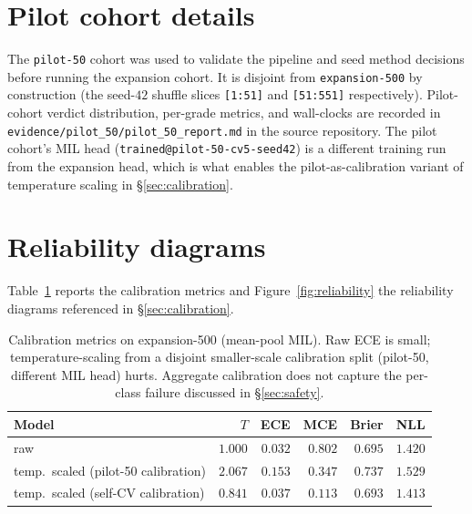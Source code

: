 \documentclass{article}
\newcommand{\SafeNum}[1]{#1}
\begin{document}
\appendix

\section{Pilot cohort details}
\label{app:pilot}

The \texttt{pilot-50} cohort was used to validate the pipeline and seed method decisions before running the expansion cohort. It is disjoint from \texttt{expansion-500} by construction (the seed-$\SafeNum{42}$ shuffle slices \texttt{[1:51]} and \texttt{[51:551]} respectively). Pilot-cohort verdict distribution, per-grade metrics, and wall-clocks are recorded in \texttt{evidence/pilot\_50/pilot\_50\_report.md} in the source repository. The pilot cohort's MIL head (\texttt{trained@pilot-50-cv5-seed42}) is a different training run from the expansion head, which is what enables the pilot-as-calibration variant of temperature scaling in \S\ref{sec:calibration}.

\section{Reliability diagrams}
\label{app:reliability}

Table~\ref{tab:calibration} reports the calibration metrics and Figure~\ref{fig:reliability} the reliability diagrams referenced in \S\ref{sec:calibration}.

\begin{table}[h]
\centering
\caption{Calibration metrics on expansion-500 (mean-pool MIL). Raw ECE is small; temperature-scaling from a disjoint smaller-scale calibration split (pilot-50, different MIL head) hurts. Aggregate calibration does not capture the per-class failure discussed in \S\ref{sec:safety}.}
\label{tab:calibration}
\begin{tabular}{@{}lrrrrr@{}}
\toprule
Model & $T$ & ECE & MCE & Brier & NLL \\
\midrule
raw                                   & $\SafeNum{1.000}$ & $\SafeNum{0.032}$ & $\SafeNum{0.802}$ & $\SafeNum{0.695}$ & $\SafeNum{1.420}$ \\
temp.\ scaled (pilot-50 calibration)  & $\SafeNum{2.067}$ & $\SafeNum{0.153}$ & $\SafeNum{0.347}$ & $\SafeNum{0.737}$ & $\SafeNum{1.529}$ \\
temp.\ scaled (self-CV calibration)   & $\SafeNum{0.841}$ & $\SafeNum{0.037}$ & $\SafeNum{0.113}$ & $\SafeNum{0.693}$ & $\SafeNum{1.413}$ \\
\bottomrule
\end{tabular}
\end{table}
\end{document}
